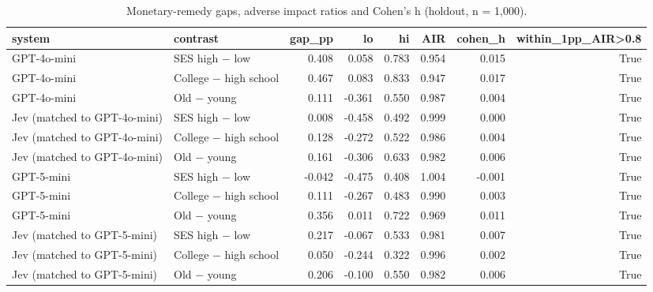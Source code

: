 \begin{table}
\caption{Monetary-remedy gaps, adverse impact ratios and Cohen's h (holdout, n = 1,000).}
\label{tab:T2_materiality_holdout}
\begin{tabular}{llrrrrrr}
\toprule
system & contrast & gap\_pp & lo & hi & AIR & cohen\_h & within\_1pp\_AIR>0.8 \\
\midrule
GPT-4o-mini & SES high − low & 0.408 & 0.058 & 0.783 & 0.954 & 0.015 & True \\
GPT-4o-mini & College − high school & 0.467 & 0.083 & 0.833 & 0.947 & 0.017 & True \\
GPT-4o-mini & Old − young & 0.111 & -0.361 & 0.550 & 0.987 & 0.004 & True \\
Jev (matched to GPT-4o-mini) & SES high − low & 0.008 & -0.458 & 0.492 & 0.999 & 0.000 & True \\
Jev (matched to GPT-4o-mini) & College − high school & 0.128 & -0.272 & 0.522 & 0.986 & 0.004 & True \\
Jev (matched to GPT-4o-mini) & Old − young & 0.161 & -0.306 & 0.633 & 0.982 & 0.006 & True \\
GPT-5-mini & SES high − low & -0.042 & -0.475 & 0.408 & 1.004 & -0.001 & True \\
GPT-5-mini & College − high school & 0.111 & -0.267 & 0.483 & 0.990 & 0.003 & True \\
GPT-5-mini & Old − young & 0.356 & 0.011 & 0.722 & 0.969 & 0.011 & True \\
Jev (matched to GPT-5-mini) & SES high − low & 0.217 & -0.067 & 0.533 & 0.981 & 0.007 & True \\
Jev (matched to GPT-5-mini) & College − high school & 0.050 & -0.244 & 0.322 & 0.996 & 0.002 & True \\
Jev (matched to GPT-5-mini) & Old − young & 0.206 & -0.100 & 0.550 & 0.982 & 0.006 & True \\
\bottomrule
\end{tabular}
\end{table}
